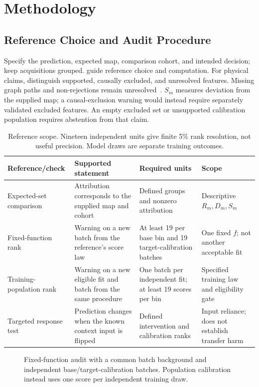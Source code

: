 \documentclass[conference]{IEEEtran}
\begin{document}
\section{Methodology}
\label{sec:method}
\subsection{Reference Choice and Audit Procedure}
Specify the prediction, expected map, comparison cohort, and intended decision; keep acquisitions grouped.  guide reference choice and computation. For physical claims, distinguish supported, causally excluded, and unresolved features. Missing graph paths and non-rejections remain unresolved~\cite{gamella2025chamber}. $S_m$ measures deviation from the supplied map; a causal-exclusion warning would instead require separately validated excluded features. An empty excluded set or unsupported calibration population requires abstention from that claim.

\begin{table}[t]
\centering
\caption{Reference scope. Nineteen independent units give finite 5\% rank resolution, not useful precision. Model draws are separate training outcomes.}
\label{tab:reference-scope}
\footnotesize
\begin{tabular}{L{0.18\textwidth}L{0.28\textwidth}L{0.23\textwidth}L{0.21\textwidth}}
\toprule
Reference/check & Supported statement & Required units & Scope \\
\midrule
Expected-set comparison & Attribution corresponds to the supplied map and cohort & Defined groups and nonzero attribution & Descriptive $R_m,D_m,S_m$ \\
Fixed-function rank & Warning on a new batch from the reference's score law & At least 19 per base bin and 19 target-calibration batches & One fixed $f$; not another acceptable fit \\
Training-population rank & Warning on a new eligible fit and batch from the same procedure & One batch per independent fit; at least 19 scores per bin & Specified training law and eligibility gate \\
Targeted response test & Prediction changes when the known context input is flipped & Defined intervention and calibration ranks & Input reliance; does not establish transfer harm \\
\bottomrule
\end{tabular}
\end{table}

\begin{figure}[t]
\centering

\caption{Fixed-function audit with a common batch background and independent base/target-calibration batches. Population calibration instead uses one score per independent training draw.}
\label{fig:workflow}
\end{figure}
\end{document}
